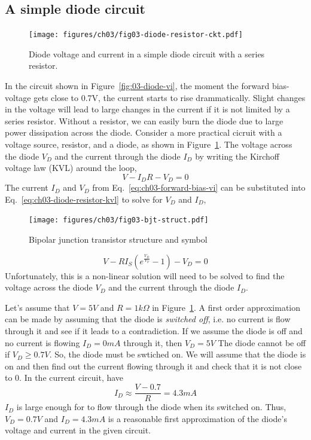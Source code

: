 \subsection{A simple diode circuit}
\begin{figure}[b]
    \centering
    \texttt{[image: figures/ch03/fig03-diode-resistor-ckt.pdf]}
    \caption{Diode voltage and current in a simple diode circuit with a series resistor.}
    \label{fig:03-diode-resistor-ckt}
\end{figure}
In the circuit shown in Figure~\ref{fig:03-diode-vi}, the moment the forward bias-voltage gets close to 0.7V, the current starts to rise drammatically. Slight changes in the voltage will lead to large changes in the current if it is not limited by a series resistor. Without a resistor, we can easily burn the diode due to large power dissipation across the diode. Consider a more practical cicruit with a voltage source, resistor, and a diode, as shown in Figure~\ref{fig:03-diode-resistor-ckt}. The voltage across the diode $V_D$ and the current through the diode $I_D$ by writing the Kirchoff voltage law (KVL) around the loop,
\begin{equation}
    V - I_D R - V_D = 0
    \label{eq:ch03-diode-resistor-kvl}
\end{equation}
The current $I_D$ and $V_D$ from Eq.~\ref{eq:ch03-forward-bias-vi} can be substituted into Eq.~\ref{eq:ch03-diode-resistor-kvl} to solve for $V_D$ and $I_D$,
\begin{figure}[t]
    \centering
    \texttt{[image: figures/ch03/fig03-bjt-struct.pdf]}
    \caption{Bipolar junction transistor structure and symbol}
    \label{fig:03-04}
\end{figure}
\begin{equation}
    V - R I_S \left( e^{\frac{V_D}{V_T}} - 1 \right) - V_D = 0
    \label{eq:ch03-diode-resistor-vd-id}
\end{equation}
Unfortunately, this is a non-linear solution will need to be solved to find the voltage across the diode $V_D$ and the current through the diode $I_D$. 

Let's assume that $V=5V$ and $R=1k\Omega$ in Figure~\ref{fig:03-diode-resistor-ckt}. A first order approximation can be made by assuming that the diode is \textit{switched off}, i.e. no current is flow through it and see if it leads to a contradiction. If we assume the diode is off and no current is flowing $I_D = 0mA$ through it, then $V_D = 5V$ The diode cannot be off if $V_D \geq 0.7V$. So, the diode must be swtiched on. We will assume that the diode is on and then find out the current flowing through it and check that it is not close to 0. In the current circuit, have 
\begin{equation}
    I_D \approx \frac{V - 0.7}{R} = 4.3mA
    \label{eq:ch03-diode-resistor-id-approx}
\end{equation}
$I_D$ is large enough for to flow through the diode when its switched on. Thus, $V_D=0.7V$ and $I_D=4.3mA$ is a reasonable first approximation of the diode's voltage and current in the given circuit.

